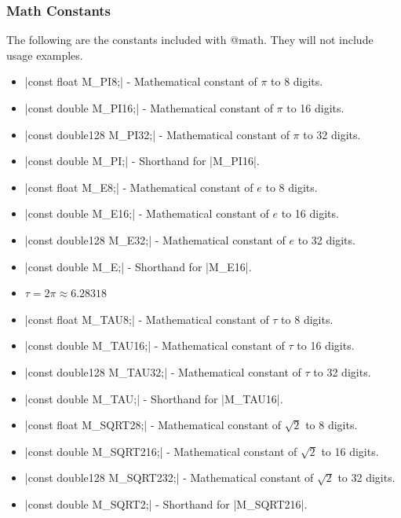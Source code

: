 \documentclass[12pt, letterpaper, oneside]{article}
\begin{document}
	\subsubsection{Math Constants}
	The following are the constants included with @math. They will not include usage examples.
	\begin{itemize}
		\item[--] \spverb|const float M_PI8;| - Mathematical constant of $\pi$ to 8 digits.
		\item[--] \spverb|const double M_PI16;| - Mathematical constant of $\pi$ to 16 digits.
		\item[--] \spverb|const double128 M_PI32;| - Mathematical constant of $\pi$ to 32 digits.
		\item[--] \spverb|const double M_PI;| - Shorthand for \spverb|M_PI16|.
		\newline
		\item[--] \spverb|const float M_E8;| - Mathematical constant of $e$ to 8 digits.
		\item[--] \spverb|const double M_E16;| - Mathematical constant of $e$ to 16 digits.
		\item[--] \spverb|const double128 M_E32;| - Mathematical constant of $e$ to 32 digits.
		\item[--] \spverb|const double M_E;| - Shorthand for \spverb|M_E16|.
		\newline
		\item[--] $\tau = 2\pi \approx 6.28318$
		\item[--] \spverb|const float M_TAU8;| - Mathematical constant of $\tau$ to 8 digits.
		\item[--] \spverb|const double M_TAU16;| - Mathematical constant of $\tau$ to 16 digits.
		\item[--] \spverb|const double128 M_TAU32;| - Mathematical constant of $\tau$ to 32 digits.
		\item[--] \spverb|const double M_TAU;| - Shorthand for \spverb|M_TAU16|.
		\newline
		\item[--] \spverb|const float M_SQRT28;| - Mathematical constant of $\sqrt{2}$ to 8 digits.
		\item[--] \spverb|const double M_SQRT216;| - Mathematical constant of $\sqrt{2}$ to 16 digits.
		\item[--] \spverb|const double128 M_SQRT232;| - Mathematical constant of $\sqrt{2}$ to 32 digits.
		\item[--] \spverb|const double M_SQRT2;| - Shorthand for \spverb|M_SQRT216|.

\end{itemize}
\end{document}
